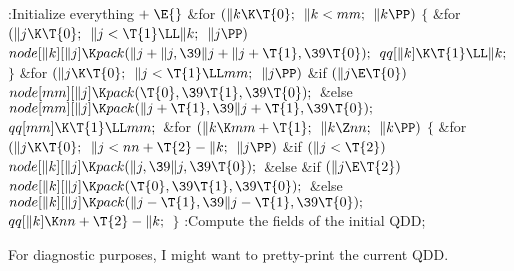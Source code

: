\Y\B\4:Initialize everything\X${}\mathrel+\E{}$\6
\&{for} ${}(\|k\K\T{0};{}$ ${}\|k<\\{mm};{}$ ${}\|k\PP){}$\5
${}\{{}$\1\6
\&{for} ${}(\|j\K\T{0};{}$ ${}\|j<\T{1}\LL\|k;{}$ ${}\|j\PP){}$\1\5
${}\\{node}[\|k][\|j]\K\\{pack}(\|j+\|j,\39\|j+\|j+\T{1},\39\T{0});{}$\2\6
${}\\{qq}[\|k]\K\T{1}\LL\|k;{}$\6
\4${}\}{}$\2\6
\&{for} ${}(\|j\K\T{0};{}$ ${}\|j<\T{1}\LL\\{mm};{}$ ${}\|j\PP){}$\1\6
\&{if} ${}(\|j\E\T{0}){}$\1\5
${}\\{node}[\\{mm}][\|j]\K\\{pack}(\T{0},\39\T{1},\39\T{0});{}$\2\6
\&{else}\1\5
${}\\{node}[\\{mm}][\|j]\K\\{pack}(\|j+\T{1},\39\|j+\T{1},\39\T{0});{}$\2\2\6
${}\\{qq}[\\{mm}]\K\T{1}\LL\\{mm};{}$\6
\&{for} ${}(\|k\K\\{mm}+\T{1};{}$ ${}\|k\Z\\{nn};{}$ ${}\|k\PP){}$\5
${}\{{}$\1\6
\&{for} ${}(\|j\K\T{0};{}$ ${}\|j<\\{nn}+\T{2}-\|k;{}$ ${}\|j\PP){}$\1\6
\&{if} ${}(\|j<\T{2}){}$\1\5
${}\\{node}[\|k][\|j]\K\\{pack}(\|j,\39\|j,\39\T{0});{}$\2\6
\&{else} \&{if} ${}(\|j\E\T{2}){}$\1\5
${}\\{node}[\|k][\|j]\K\\{pack}(\T{0},\39\T{1},\39\T{0});{}$\2\6
\&{else}\1\5
${}\\{node}[\|k][\|j]\K\\{pack}(\|j-\T{1},\39\|j-\T{1},\39\T{0});{}$\2\2\6
${}\\{qq}[\|k]\K\\{nn}+\T{2}-\|k;{}$\6
\4${}\}{}$\2\6
:Compute the  fields of the initial QDD\X;\par
\fi

For diagnostic purposes, I might want to pretty-print the current QDD.

